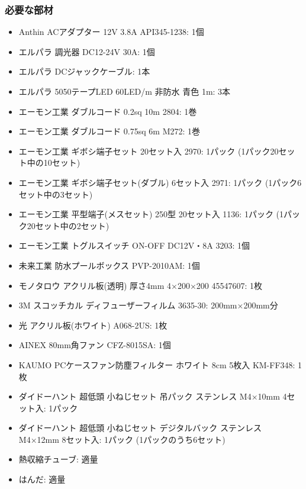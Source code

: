 \documentclass[titlepage,10pt,a4paper,uplatex]{jsbook}
\begin{document}
\subsubsection{必要な部材}
\begin{itemize}
\item Anthin ACアダプター 12V 3.8A API345-1238: 1個
\item エルパラ 調光器 DC12-24V 30A: 1個
\item エルパラ DCジャックケーブル: 1本
\item エルパラ 5050テープLED 60LED/m 非防水 青色 1m: 3本
\item エーモン工業 ダブルコード 0.2sq 10m 2804: 1巻
\item エーモン工業 ダブルコード 0.75sq 6m M272: 1巻
\item エーモン工業 ギボシ端子セット 20セット入 2970: 1パック (1パック20セット中の10セット)
\item エーモン工業 ギボシ端子セット(ダブル) 6セット入 2971: 1パック (1パック6セット中の3セット)
\item エーモン工業 平型端子(メスセット) 250型 20セット入 1136: 1パック (1パック20セット中の2セット)
\item エーモン工業 トグルスイッチ ON-OFF DC12V・8A 3203: 1個
\item 未来工業 防水プールボックス PVP-2010AM: 1個
\item モノタロウ アクリル板(透明) 厚さ4mm 4×200×200 45547607: 1枚
\item 3M スコッチカル ディフューザーフィルム 3635-30: 200mm×200mm分
\item 光 アクリル板(ホワイト) A068-2US: 1枚
\item AINEX 80mm角ファン CFZ-8015SA: 1個
\item KAUMO PCケースファン防塵フィルター ホワイト 8cm 5枚入 KM-FF348: 1枚
\item ダイドーハント 超低頭 小ねじセット 吊パック ステンレス M4×10mm 4セット入: 1パック
\item ダイドーハント 超低頭 小ねじセット デジタルバック ステンレス M4×12mm 8セット入: 1パック (1パックのうち6セット)
\item 熱収縮チューブ: 適量
\item はんだ: 適量
\end{itemize}
\end{document}
